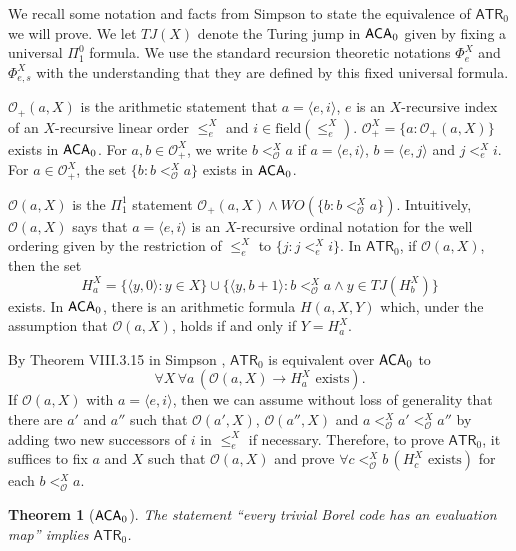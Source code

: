 \documentclass{amsart}
\newtheorem{thm}{Theorem}[section]
\theoremstyle{definition}
\theoremstyle{remark}
\newcommand{\system}[1]{\mbox{\fontfamily{cmss}\fontshape{n}\fontseries{m}%
    \selectfont#1}}
\newcommand{\ACA}{\system{ACA}\ensuremath{_0}}
\begin{document}
We recall some notation and facts from Simpson \cite{sosa} to state the equivalence of $\mathsf{ATR}_0$ we will prove. We let $TJ(X)$ denote the Turing jump in $\ACA$ given 
by fixing a universal $\Pi^0_1$ formula. We use the standard recursion theoretic notations $\Phi_e^X$ and $\Phi_{e,s}^X$ with the understanding that 
they are defined by this fixed universal formula. 

$\mathcal{O}_+(a,X)$ is the arithmetic statement that $a = \langle e,i \rangle$, $e$ is an $X$-recursive index of an $X$-recursive linear order $\leq_e^X$ 
and $i \in \text{field}(\leq_e^X)$. $\mathcal{O}_+^X = \{ a : \mathcal{O}_+(a,X) \}$ exists in $\ACA$. For $a, b \in \mathcal{O}_+^X$, we write $b <_{\mathcal{O}}^X a$ 
if $a = \langle e,i \rangle$, $b = \langle e,j \rangle$ and $j <_e^X i$. For $a \in \mathcal{O}_+^X$, the set $\{ b : b <_{\mathcal{O}}^X a \}$ exists in $\ACA$. 

$\mathcal{O}(a,X)$ is the $\Pi^1_1$ statement 
$\mathcal{O}_+(a,X) \wedge WO(\{ b : b <_{\mathcal{O}}^X a \})$. Intuitively, $\mathcal{O}(a,X)$ says that $a = \langle e,i \rangle$ is an $X$-recursive ordinal notation 
for the well ordering given by the restriction of $\leq_e^X$ to $\{ j : j <_e^X i \}$. In $\mathsf{ATR}_0$, if $\mathcal{O}(a,X)$, then the set 
\[
H_a^X = \{ \langle y,0 \rangle : y \in X \} \cup \{ \langle y, b+1 \rangle : b <_{\mathcal{O}}^X a \wedge y \in TJ(H_b^X) \}
\]
exists. In $\ACA$, there is an arithmetic formula $H(a,X,Y)$ which, under the assumption that $\mathcal{O}(a,X)$, holds if and only 
if $Y = H_a^X$.  

By Theorem VIII.3.15 in Simpson \cite{sosa}, $\mathsf{ATR}_0$ is equivalent over $\ACA$ to 
\[
\forall X \, \forall a \, ( \mathcal{O}(a,X) \rightarrow H_a^X \text{ exists}).
\]
If $\mathcal{O}(a,X)$ with $a = \langle e,i \rangle$, then we can assume without loss of generality that there are 
$a'$ and $a''$ such that $\mathcal{O}(a',X)$, $\mathcal{O}(a'',X)$ and $a <_{\mathcal{O}}^X a' <_{\mathcal{O}}^X a''$ by adding two new successors 
of $i$ in $\leq_e^X$ if necessary. Therefore, to prove $\mathsf{ATR}_0$, it suffices to fix $a$ and $X$ such that $\mathcal{O}(a,X)$ and prove 
$\forall c <_{\mathcal{O}}^X b \, (H_c^X \text{ exists})$ for each $b <_{\mathcal{O}}^X a$.  

\begin{thm}[$\ACA$]
\label{thm:trivial}
The statement ``every trivial Borel code has an evaluation map'' implies $\mathsf{ATR}_0$. 
\end{thm}
\end{document}
